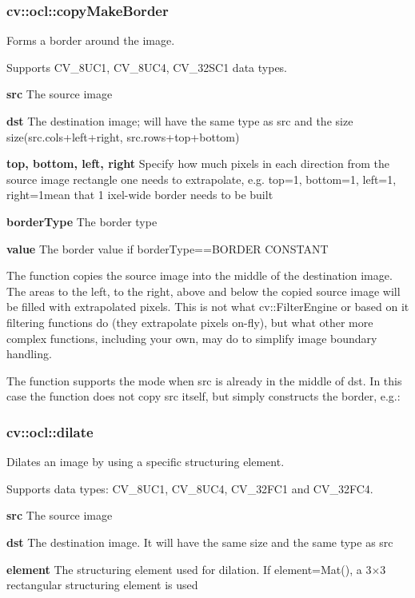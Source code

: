 \documentclass{article}
\begin{document}
\newpage

\subsubsection{cv::ocl::copyMakeBorder}
\label{subsubsec:mylabel34}
Forms a border around the image.

Supports CV{\_}8UC1, CV{\_}8UC4, CV{\_}32SC1 data types.

\textbf{src }The source image

\textbf{dst }The destination image; will have the same type as src and the
size size(src.cols+left+right, src.rows+top+bottom)

\textbf{top, bottom, left, right }Specify how much pixels in each direction
from the source image rectangle one needs to extrapolate, e.g. top=1,
bottom=1, left=1, right=1mean that 1 ixel-wide border needs to be built

\textbf{borderType }The border type

\textbf{value }The border value if borderType==BORDER CONSTANT

The function copies the source image into the middle of the destination
image. The areas to the left, to the right, above and below the copied
source image will be filled with extrapolated pixels. This is not what
cv::FilterEngine or based on it filtering functions do (they extrapolate
pixels on-fly), but what other more complex functions, including your own,
may do to simplify image boundary handling.

The function supports the mode when src is already in the middle of dst. In
this case the function does not copy src itself, but simply constructs the
border, e.g.:

\newpage

\subsubsection{cv::ocl::dilate }
\label{subsubsec:mylabel35}
Dilates an image by using a specific structuring element.

Supports data types: CV{\_}8UC1, CV{\_}8UC4, CV{\_}32FC1 and CV{\_}32FC4.

\textbf{src }The source image

\textbf{dst }The destination image. It will have the same size and the same
type as src

\textbf{element }The structuring element used for dilation. If
element=Mat(), a 3$\times $3 rectangular structuring element is used
\end{document}
